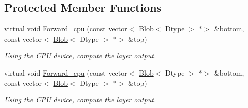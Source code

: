 \subsection*{Protected Member Functions}
\begin{DoxyCompactItemize}
\item 
\mbox{\label{classcaffe_1_1_memory_data_layer_a4a573b91dfe4e83cce4bc311355e9af3}} 
virtual void \mbox{\hyperlink{classcaffe_1_1_memory_data_layer_a4a573b91dfe4e83cce4bc311355e9af3}{Forward\+\_\+cpu}} (const vector$<$ \mbox{\hyperlink{classcaffe_1_1_blob}{Blob}}$<$ Dtype $>$ $\ast$$>$ \&bottom, const vector$<$ \mbox{\hyperlink{classcaffe_1_1_blob}{Blob}}$<$ Dtype $>$ $\ast$$>$ \&top)
\begin{DoxyCompactList}\small\item\em Using the C\+PU device, compute the layer output. \end{DoxyCompactList}\item 
\mbox{\label{classcaffe_1_1_memory_data_layer_afe157d4c4f334223b0db542fe5006ca1}} 
virtual void \mbox{\hyperlink{classcaffe_1_1_memory_data_layer_afe157d4c4f334223b0db542fe5006ca1}{Forward\+\_\+cpu}} (const vector$<$ \mbox{\hyperlink{classcaffe_1_1_blob}{Blob}}$<$ Dtype $>$ $\ast$$>$ \&bottom, const vector$<$ \mbox{\hyperlink{classcaffe_1_1_blob}{Blob}}$<$ Dtype $>$ $\ast$$>$ \&top)
\begin{DoxyCompactList}\small\item\em Using the C\+PU device, compute the layer output. \end{DoxyCompactList}\end{DoxyCompactItemize}
